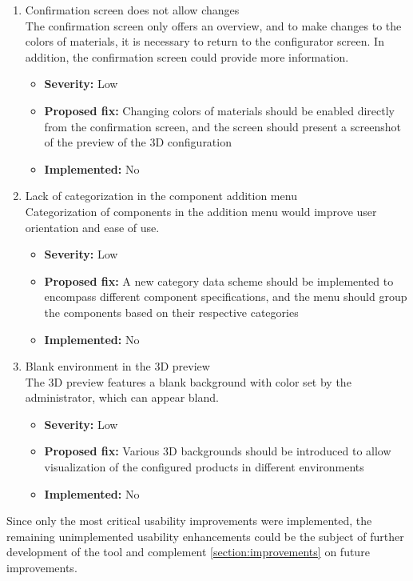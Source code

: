 \begin{enumerate}[label=\textbf{I\arabic*:}, leftmargin=27pt]
    \item Confirmation screen does not allow changes
        \vspace{2pt}
        \\The confirmation screen only offers an overview, and to make changes to the colors of materials, it is necessary to return to the configurator screen. In addition, the confirmation screen could provide more information.
        \begin{itemize}[noitemsep, label=\trianglebullet]
            \item \textbf{Severity:} Low
            \item \textbf{Proposed fix:} Changing colors of materials should be enabled directly from the confirmation screen, and the screen should present a screenshot of the preview of the 3D configuration
            \item \textbf{Implemented:} No
        \end{itemize}
        \vspace{4pt}

    \item Lack of categorization in the component addition menu
        \vspace{2pt}
        \\Categorization of components in the addition menu would improve user orientation and ease of use.
        \begin{itemize}[noitemsep, label=\trianglebullet]
            \item \textbf{Severity:} Low
            \item \textbf{Proposed fix:} A new category data scheme should be implemented to encompass different component specifications, and the menu should group the components based on their respective categories
            \item \textbf{Implemented:} No
        \end{itemize}
        \vspace{4pt}

    \item Blank environment in the 3D preview
        \vspace{2pt}
        \\The 3D preview features a blank background with color set by the administrator, which can appear bland.
        \begin{itemize}[noitemsep, label=\trianglebullet]
            \item \textbf{Severity:} Low
            \item \textbf{Proposed fix:} Various 3D backgrounds should be introduced to allow visualization of the configured products in different environments
            \item \textbf{Implemented:} No
        \end{itemize}
        \vspace{4pt}
\end{enumerate}

Since only the most critical usability improvements were implemented, the remaining unimplemented usability enhancements could be the subject of further development of the tool and complement \autoref{section:improvements} on future improvements.

